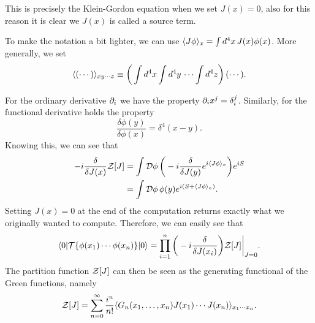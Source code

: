 This is precisely the Klein-Gordon equation when we set $J(x) = 0$, also for this reason it is clear we $J(x)$ is called a source term. 
\begin{notz}
    To make the notation a bit lighter, we can use $\langle J\phi \rangle_x =\int d^4x\,J(x)\phi(x)$. More generally, we set 
    \begin{equation}
        \langle (\cdots) \rangle_{xy\cdots z} \equiv \bigg(\int d^4x\int d^4y\,\cdots\int d^4z\bigg)\,(\cdots).
    \end{equation}
\end{notz}
For the ordinary derivative $\partial_i$ we have the property $\partial_ix^j = \delta^j_i$. Similarly, for the functional derivative holds the property
\begin{equation}
    \frac{\delta\phi(y)}{\delta\phi(x)} = \delta^4(x - y).
\end{equation}
Knowing this, we can see that 
\begin{equation}
    \begin{split}
        -i\frac{\delta}{\delta J(x)}\mathcal{Z}[J] &= \int \mathcal{D}\phi\,\bigg(-i\frac{\delta}{\delta J(y)}e^{i\langle J\phi \rangle_x}\bigg)e^{iS} \\
        &= \int \mathcal{D}\phi\,\phi(y)e^{i(S + \langle J\phi \rangle_x)}.
    \end{split}
\end{equation}
Setting $J(x) = 0$ at the end of the computation returns exactly what we originally wanted to compute. Therefore, we can easily see that 
\begin{equation}
    \langle 0 | \mathcal{T}{\{\phi(x_1)\cdots\phi(x_n)\}} | 0 \rangle = \prod_{i=1}^n\bigg(-i\frac{\delta}{\delta J(x_i)}\bigg)\mathcal{Z}[J]\bigg|_{J = 0}.
\end{equation}
The partition function $\mathcal{Z}[J]$ can then be seen as the generating functional of the Green functions, namely 
\begin{equation}
    \mathcal{Z}[J] = \sum_{n = 0}^\infty \frac{i^n}{n!}\langle G_n(x_1,\dots,x_n)J(x_1)\cdots J(x_n) \rangle_{x_1\cdots x_n}.
\end{equation}

